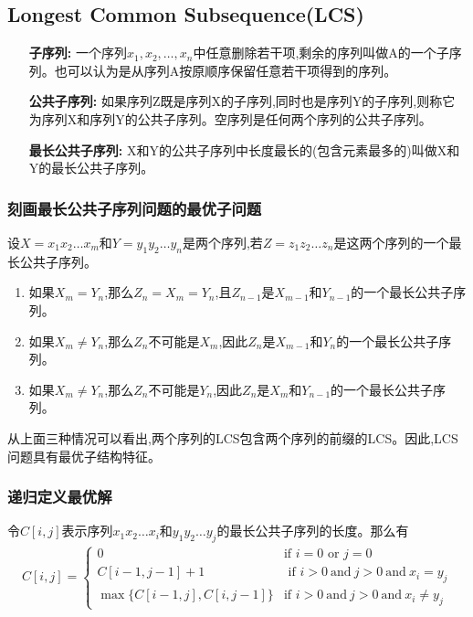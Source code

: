 \documentclass{article}
\begin{document}
\subsection{Longest Common Subsequence(LCS)}
\begin{enumerate}
    \item [\textbf{子序列:}]一个序列$x_1,x_2,\dots,x_n$中任意删除若干项,剩余的序列叫做A的一个子序列。也可以认为是从序列A按原顺序保留任意若干项得到的序列。
    \item [\textbf{公共子序列:}]如果序列Z既是序列X的子序列,同时也是序列Y的子序列,则称它为序列X和序列Y的公共子序列。空序列是任何两个序列的公共子序列。
    \item [\textbf{最长公共子序列:}]X和Y的公共子序列中长度最长的(包含元素最多的)叫做X和Y的最长公共子序列。
\end{enumerate}
\subsubsection{刻画最长公共子序列问题的最优子问题}
设$X = x_1x_2\dots x_m$和$Y = y_1y_2\dots y_n$是两个序列,若$Z = z_1z_2\dots z_n$是这两个序列的一个最长公共子序列。
\begin{enumerate}
    \item 如果$X_m = Y_n$,那么$Z_n = X_m = Y_n$,且$Z_{n-1}$是$X_{m-1}$和$Y_{n-1}$的一个最长公共子序列。
    \item 如果$X_m \neq Y_n$,那么$Z_n$不可能是$X_m$,因此$Z_n$是$X_{m-1}$和$Y_n$的一个最长公共子序列。
    \item 如果$X_m \neq Y_n$,那么$Z_n$不可能是$Y_n$,因此$Z_n$是$X_m$和$Y_{n-1}$的一个最长公共子序列。
\end{enumerate}\par
从上面三种情况可以看出,两个序列的LCS包含两个序列的前缀的LCS。因此,LCS问题具有最优子结构特征。
\subsubsection{递归定义最优解}
令$C[i,j]$表示序列$x_1x_2\dots x_i$和$y_1y_2\dots y_j$的最长公共子序列的长度。那么有
\begin{align*}
    C[i,j] = \begin{cases}
        0 & \text{if } i = 0 \text{ or } j = 0 \\
        C[i-1,j-1] + 1 & \text{ if } i >0 \ \text{and} \ j > 0 \ \text{and} \ x_i = y_j \\
        \max\{C[i-1,j],C[i,j-1]\} & \text{if } i >0 \ \text{and} \ j > 0 \ \text{and} \ x_i \neq y_j
    \end{cases}
\end{align*}
\end{document}
